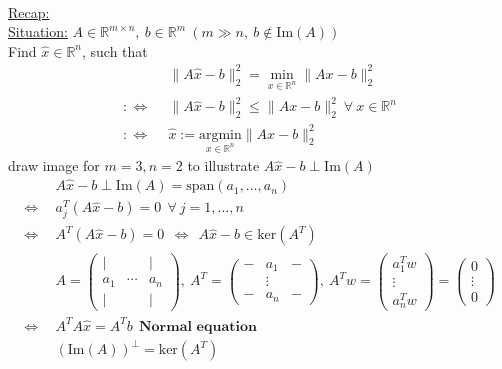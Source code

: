 \begin{frame}
	~\\
	{\blank
	\underline{Recap:}\\
	\underline{Situation:} $A\in\mathbb{R}^{m\times n},~b\in\mathbb{R}^m~(m\gg n,~b\notin\text{Im}(A))$\\
	Find $\widehat{x}\in\mathbb{R}^n$, such that
	\begin{align*}
	&\|A\widehat{x}-b\|_2^2=\min_{x\in\mathbb{R}^n}\|Ax-b\|_2^2\\
	:\Leftrightarrow~~&\|A\widehat{x}-b\|_2^2\leq\|Ax-b\|_2^2~\forall~x\in\mathbb{R}^n\\
	:\Leftrightarrow~~&\widehat{x}:=\underset{x\in\mathbb{R}^n}{\mathrm{argmin}}\|Ax-b\|_2^2
	\end{align*}
	draw image for $m=3,n=2$ to illustrate $A\widehat{x}-b\perp\text{Im}(A)$
	\begin{align*}
	&A\widehat{x}-b\perp\text{Im}(A)=\text{span}(a_1,\dots,a_n)\\
	\Leftrightarrow~~&a_j^T(A\widehat{x}-b)=0~~\forall~j=1,\dots,n\\
	\Leftrightarrow~~&A^T(A\widehat{x}-b)=0~~\Leftrightarrow~~A\widehat{x}-b\in\text{ker}(A^T)\\
	&A=\begin{pmatrix}
	|&~&|\\a_1&\cdots&a_n\\|&~&|
	\end{pmatrix},~A^T=\begin{pmatrix}
	-&a_1&-\\~&\vdots&~\\-&a_n&-
	\end{pmatrix},~A^Tw=\begin{pmatrix}
	a_1^Tw\\\vdots\\a_n^Tw
	\end{pmatrix}=\begin{pmatrix}
	0\\\vdots\\0
	\end{pmatrix}\\
	\Leftrightarrow~~&A^TA\widehat{x}=A^Tb~~\textbf{Normal equation}\\
	&(\text{Im}(A))^\bot=\text{ker}(A^T)
	\end{align*}
}
\end{frame}

